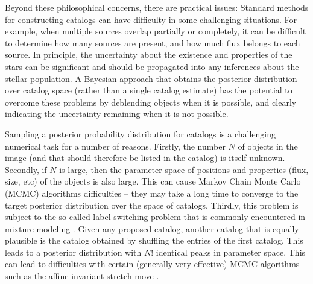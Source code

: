 \documentclass[12pt, preprint]{aastex}
\begin{document}
Beyond these philosophical concerns, there are practical issues:
Standard methods for constructing catalogs can have difficulty in some
challenging situations. For example, when multiple sources overlap partially
or completely, it can be difficult to determine how many sources are present,
and how much flux belongs to each source. In principle, the uncertainty about
the existence and properties of the stars can be significant and should be
propagated into any inferences about the stellar population. A Bayesian approach
that obtains the posterior distribution over catalog space (rather than a single
catalog estimate) has the potential to overcome these problems by deblending
objects when it is possible, and clearly indicating the uncertainty remaining
when it is not possible.

Sampling a posterior probability distribution for catalogs is a challenging
numerical task for a number of reasons. Firstly, the number $N$ of objects in the
image (and that should therefore be listed in the catalog) is itself unknown.
Secondly, if $N$ is large, then the parameter space
of positions and properties (flux, size, etc) of the objects is also large.
This can cause Markov Chain Monte Carlo (MCMC) algorithms difficulties -- they
may take a long time to converge to the target posterior distribution over
the space of catalogs. Thirdly, this problem is subject to the so-called
label-switching problem that is commonly encountered in mixture modeling
\citep[e.g.][]{label_switching}. Given any proposed catalog, another catalog that is
equally plausible is the catalog obtained by shuffling the entries of the first
catalog. This leads to a posterior distribution with $N!$ identical peaks in
parameter space. This can lead to difficulties with certain (generally very
effective) MCMC algorithms such as the affine-invariant stretch move
\citep{goodman, emcee}.
\end{document}
